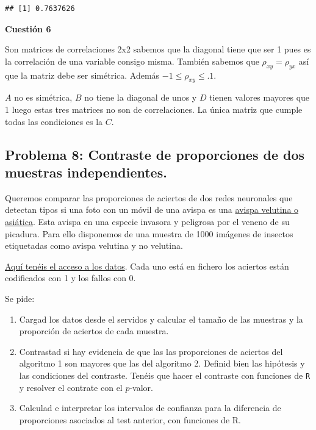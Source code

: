 \documentclass[
]{article}
\providecommand{\tightlist}{%
  \setlength{\itemsep}{0pt}\setlength{\parskip}{0pt}}
\begin{document}
\begin{verbatim}
## [1] 0.7637626
\end{verbatim}

\textbf{Cuestión 6}

Son matrices de correlaciones 2x2 sabemos que la diagonal tiene que ser
1 pues es la correlación de una variable consigo misma. También sabemos
que \(\rho_{xy}=\rho_{yx}\) así que la matriz debe ser simétrica. Además
\(-1\leq\rho_{xy}\leq. 1\).

\(A\) no es simétrica, \(B\) no tiene la diagonal de unos y \(D\) tienen
valores mayores que 1 luego estas tres matrices no son de correlaciones.
La única matriz que cumple todas las condiciones es la \(C\).

\hypertarget{problema-8-contraste-de-proporciones-de-dos-muestras-independientes.}{%
\subsection{Problema 8: Contraste de proporciones de dos muestras
independientes.}\label{problema-8-contraste-de-proporciones-de-dos-muestras-independientes.}}

Queremos comparar las proporciones de aciertos de dos redes neuronales
que detectan tipos si una foto con un móvil de una avispa es una
\href{https://es.wikipedia.org/wiki/Vespa_velutina}{avispa velutina o
asiática}. Esta avispa en una especie invasora y peligrosa por el veneno
de su picadura. Para ello disponemos de una muestra de 1000 imágenes de
insectos etiquetadas como avispa velutina y no velutina.

\href{http://bioinfo.uib.es/~recerca/MATIIIGINF/velutina}{Aquí tenéis el
acceso a los datos}. Cada uno está en fichero los aciertos están
codificados con 1 y los fallos con 0.

Se pide:

\begin{enumerate}
\def\labelenumi{\arabic{enumi}.}
\tightlist
\item
  Cargad los datos desde el servidos y calcular el tamaño de las
  muestras y la proporción de aciertos de cada muestra.
\item
  Contrastad si hay evidencia de que las las proporciones de aciertos
  del algoritmo 1 son mayores que las del algoritmo 2. Definid bien las
  hipótesis y las condiciones del contraste. Tenéis que hacer el
  contraste con funciones de \texttt{R} y resolver el contrate con el
  \(p\)-valor.
\item
  Calculad e interpretar los intervalos de confianza para la diferencia
  de proporciones asociados al test anterior, con funciones de R.
\end{enumerate}
\end{document}
